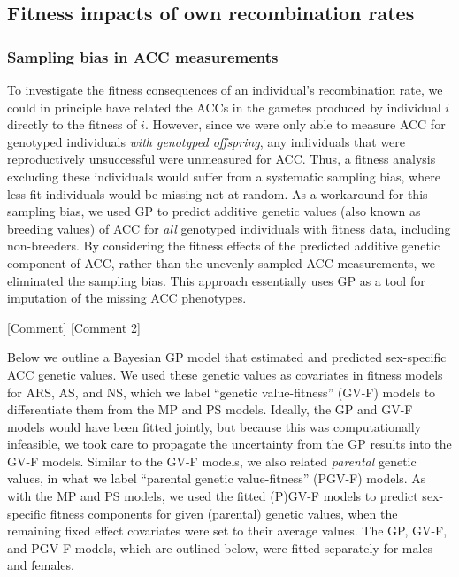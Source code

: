 \documentclass[dvipsnames]{article}
\begin{document}
\subsection*{Fitness impacts of own recombination rates}

\subsubsection*{Sampling bias in ACC measurements}

To investigate the fitness consequences of an individual's recombination rate, we could in principle have related the ACCs in the gametes produced by individual $i$ directly to the fitness of $i$.
However, since we were only able to measure ACC for genotyped individuals \textit{with genotyped offspring}, any individuals that were reproductively unsuccessful were unmeasured for ACC.
Thus, a fitness analysis excluding these individuals would suffer from a systematic sampling bias, where less fit individuals would be missing not at random.
As a workaround for this sampling bias, we used GP to predict additive genetic values (also known as breeding values) of ACC for \textit{all} genotyped individuals with fitness data, including non-breeders.
By considering the fitness effects of the predicted additive genetic component of ACC, rather than the unevenly sampled ACC measurements, we eliminated the sampling bias.
This approach essentially uses GP as a tool for imputation of the missing ACC phenotypes.

[Comment]
[Comment 2]


Below we outline a Bayesian GP model that estimated and predicted sex-specific ACC genetic values. 
We used these genetic values as covariates in fitness models for ARS, AS, and NS, which we label ``genetic value-fitness'' (GV-F) models to differentiate them from the MP and PS models.
Ideally, the GP and GV-F models would have been fitted jointly, but because this was computationally infeasible, we took care to propagate the uncertainty from the GP results into the GV-F models.
Similar to the GV-F models, we also related \textit{parental} genetic values, in what we label ``parental genetic value-fitness'' (PGV-F) models.
As with the MP and PS models, we used the fitted (P)GV-F models to predict sex-specific fitness components for given (parental) genetic values, when the remaining fixed effect covariates were set to their average values.
The GP, GV-F, and PGV-F models, which are outlined below, were fitted separately for males and females.
\end{document}
